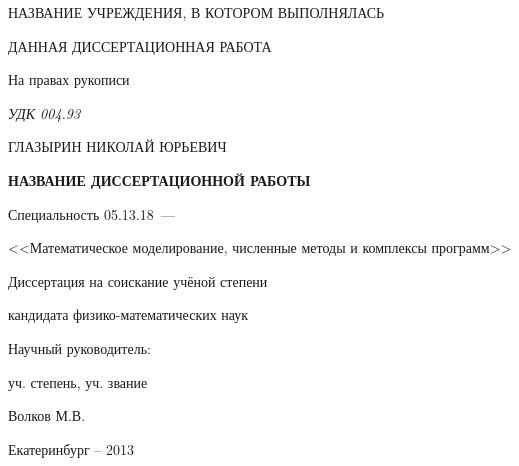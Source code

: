 \thispagestyle{empty}

\begin{center}
НАЗВАНИЕ УЧРЕЖДЕНИЯ, В КОТОРОМ ВЫПОЛНЯЛАСЬ\par
ДАННАЯ ДИССЕРТАЦИОННАЯ РАБОТА\par 
\par
\end{center}

\vspace{20mm}
\begin{flushright}
На правах рукописи

{\sl УДК 004.93}
\end{flushright}

\vspace{30mm}
\begin{center}
{\large ГЛАЗЫРИН НИКОЛАЙ ЮРЬЕВИЧ}
\end{center}

\vspace{5mm}
\begin{center}
{\bf \large НАЗВАНИЕ ДИССЕРТАЦИОННОЙ РАБОТЫ
\par}

\vspace{10mm}
{%
Специальность 05.13.18~---

<<Математическое моделирование, численные методы и комплексы программ>>
}

\vspace{10mm}
Диссертация на соискание учёной степени

кандидата физико-математических наук
\end{center}

\vspace{20mm}
\begin{flushright}
Научный руководитель:

уч. степень, уч. звание

Волков М.В.

\end{flushright}

\vspace{20mm}
\begin{center}
{Екатеринбург -- 2013}
\end{center}

\newpage